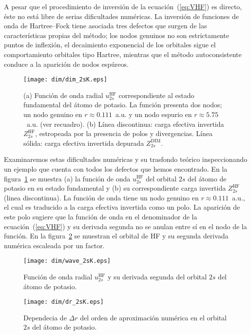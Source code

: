 A pesar que el procedimiento de inversión de la ecuación~(\ref{eq:VHF}) 
es directo, éste no está libre de serias dificultades numéricas. 
La inversión de funciones de onda de Hartree--Fock tiene asociada tres
defectos que surgen de las características propias del método; los nodos 
genuinos no son estrictamente puntos de inflexión, el decaimiento 
exponencial de los orbitales sigue el comportamiento orbitales tipo 
Hartree, mientras que el método autoconsistente conduce a la aparición 
de nodos espúreos. 

\begin{figure}[t]
\centering
\texttt{[image: dim/dim\_2sK.eps]} 
\caption[Función de onda radial y carga efectiva correspondiente.]
{(a) Función de onda radial $u_{2s}^{\mathrm{HF}}$ 
correspondiente al estado fundamental del átomo de potasio.
La función presenta dos nodos; un nodo genuino en $r \approx 0.111$~a.u. 
y un nodo espurio en $r\approx 5.75$~a.u. (ver recuadro). 
(b) Línea discontinua: carga efectiva invertida $Z_{2s}^{\mathrm{HF}}$, 
estropeada por la presencia de polos y divergencias.
Línea sólida: carga efectiva invertida depurada $Z_{2s}^{\mathrm{DIM}}$.}
\label{fig:2sK}
\end{figure}

Examinaremos estas dificultades numéricas y su trasfondo teórico 
inspeccionando un ejemplo que cuenta con todos los defectos que hemos 
encontrado. En la figura~\ref{fig:2sK} se muestra (a) la función de 
onda $u_{2s}^{\mathrm{HF}}$ del orbital $2s$ del átomo de potasio en su 
estado fundamental y (b) su correspondiente carga invertida 
$Z_{2s}^{\mathrm{HF}}$ (linea discontinua). La función de onda tiene un 
nodo genuino en $r\approx 0.111$~a.u., el cual es traducido a la carga 
efectiva invertida como un polo. La aparición de este polo sugiere que 
la función de onda en el denominador de la ecuación~(\ref{eq:VHF}) y su 
derivada segunda no se anulan entre sí en el nodo de la función. En la 
figura~\ref{fig:wave2sK} se muestran el orbital de HF y su segunda 
derivada numérica escaleada por un factor. 


\begin{figure}
\centering
\texttt{[image: dim/wave\_2sK.eps]} 
\caption[Función de onda radial y su derivada segunda de K.]
{Función de onda radial $u_{2s}^{\mathrm{HF}}$ y su derivada segunda 
del orbital $2s$ del átomo de potasio.}
\label{fig:wave2sK}
\end{figure}

\begin{figure}
\centering
\texttt{[image: dim/dr\_2sK.eps]} 
\caption[Dependecia de $\Delta r$ del orden de aproximación numérica.]
{Dependecia de $\Delta r$ del orden de aproximación numérica en el 
orbital $2s$ del átomo de potasio.}
\label{fig:dr2sK}
\end{figure}

